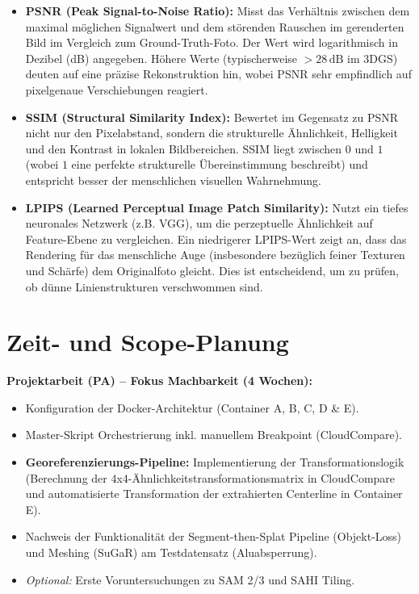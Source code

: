 \documentclass[12pt,a4paper]{article}
\begin{document}
\begin{itemize}
    \item \textbf{PSNR (Peak Signal-to-Noise Ratio):} 
          Misst das Verhältnis zwischen dem maximal möglichen Signalwert und dem störenden Rauschen im gerenderten Bild im Vergleich zum Ground-Truth-Foto. Der Wert wird logarithmisch in Dezibel (dB) angegeben. Höhere Werte (typischerweise $> 28\,\text{dB}$ im 3DGS) deuten auf eine präzise Rekonstruktion hin, wobei PSNR sehr empfindlich auf pixelgenaue Verschiebungen reagiert.
          
    \item \textbf{SSIM (Structural Similarity Index):} 
          Bewertet im Gegensatz zu PSNR nicht nur den Pixelabstand, sondern die strukturelle Ähnlichkeit, Helligkeit und den Kontrast in lokalen Bildbereichen. SSIM liegt zwischen $0$ und $1$ (wobei $1$ eine perfekte strukturelle Übereinstimmung beschreibt) und entspricht besser der menschlichen visuellen Wahrnehmung.
          
    \item \textbf{LPIPS (Learned Perceptual Image Patch Similarity):} 
          Nutzt ein tiefes neuronales Netzwerk (z.B. VGG), um die perzeptuelle Ähnlichkeit auf Feature-Ebene zu vergleichen. Ein niedrigerer LPIPS-Wert zeigt an, dass das Rendering für das menschliche Auge (insbesondere bezüglich feiner Texturen und Schärfe) dem Originalfoto gleicht. Dies ist entscheidend, um zu prüfen, ob dünne Linienstrukturen verschwommen sind.
\end{itemize}

\section{Zeit- und Scope-Planung}
\vspace{0.3cm}
\noindent\textbf{Projektarbeit (PA) -- Fokus Machbarkeit (4 Wochen):}
\begin{itemize}[noitemsep]
    \item Konfiguration der Docker-Architektur (Container A, B, C, D \& E).
    \item Master-Skript Orchestrierung inkl. manuellem Breakpoint (CloudCompare).
    \item \textbf{Georeferenzierungs-Pipeline:} Implementierung der Transformationslogik (Berechnung der 4x4-Ähnlichkeitstransformationsmatrix in CloudCompare und automatisierte Transformation der extrahierten Centerline in Container E).
    \item Nachweis der Funktionalität der Segment-then-Splat Pipeline (Objekt-Loss) und Meshing (SuGaR) am Testdatensatz (Aluabsperrung).
    \item \textit{Optional:} Erste Voruntersuchungen zu SAM 2/3 und SAHI Tiling.
\end{itemize}
\end{document}
